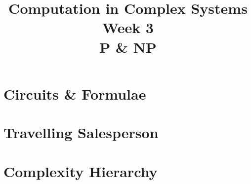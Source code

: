\documentclass[]{article}
\title{Computation in Complex Systems\\
	Week 3\\
	P \& NP}
\begin{document}
\maketitle

\section{Circuits \& Formulae}

\section{Travelling Salesperson}

\section{Complexity Hierarchy}
\end{document}
